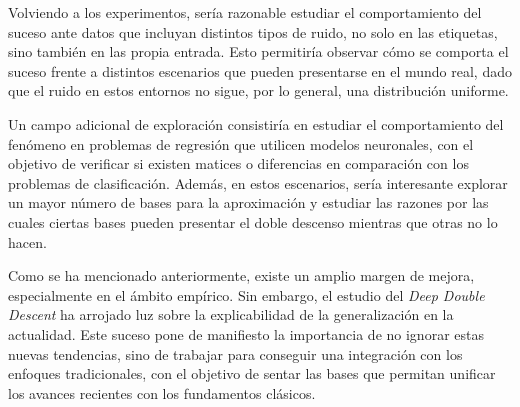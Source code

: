 Volviendo a los experimentos, sería razonable estudiar el comportamiento del suceso ante datos que incluyan distintos tipos de ruido, no solo en las etiquetas, sino también en las propia entrada. Esto permitiría observar cómo se comporta el suceso frente a distintos escenarios que pueden presentarse en el mundo real, dado que el ruido en estos entornos no sigue, por lo general, una distribución uniforme.

Un campo adicional de exploración consistiría en estudiar el comportamiento del fenómeno en problemas de regresión que utilicen modelos neuronales, con el objetivo de verificar si existen matices o diferencias en comparación con los problemas de clasificación. Además, en estos escenarios, sería interesante explorar un mayor número de bases para la aproximación y estudiar las razones por las cuales ciertas bases pueden presentar el doble descenso mientras que otras no lo hacen.

Como se ha mencionado anteriormente, existe un amplio margen de mejora, especialmente en el ámbito empírico. Sin embargo, el estudio del \textit{Deep Double Descent} ha arrojado luz sobre la explicabilidad de la generalización en la actualidad. Este suceso pone de manifiesto la importancia de no ignorar estas nuevas tendencias, sino de trabajar para conseguir una integración con los enfoques tradicionales, con el objetivo de sentar las bases que permitan unificar los avances recientes con los fundamentos clásicos.

\endinput